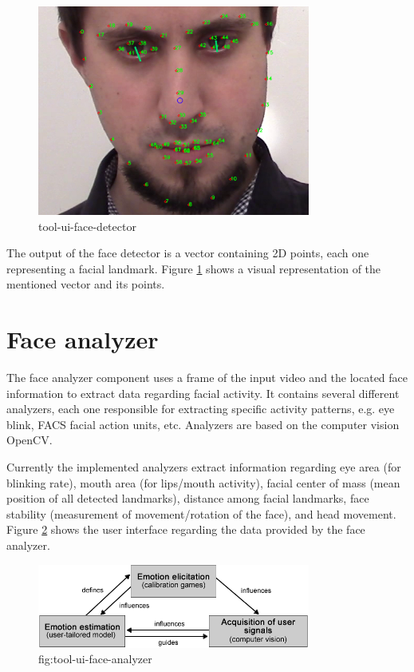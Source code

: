 \begin{figure}[h]
    \centering
    \includegraphics[width=0.8\textwidth]{figures/tool-ui-face-detector.png}
    \caption{tool-ui-face-detector}
    \label{fig:tool-ui-face-detector}
\end{figure}

The output of the face detector is a vector containing 2D points, each one representing a facial landmark. Figure \ref{fig:tool-ui-face-detector} shows a visual representation of the mentioned vector and its points.

\section{Face analyzer}

The face analyzer component uses a frame of the input video and the located face information to extract data regarding facial activity. It contains several different analyzers, each one responsible for extracting specific activity patterns, e.g. eye blink, FACS facial action units, etc. Analyzers are based on the computer vision OpenCV.

Currently the implemented analyzers extract information regarding eye area (for blinking rate), mouth area (for lips/mouth activity), facial center of mass (mean position of all detected landmarks), distance among facial landmarks, face stability (measurement of movement/rotation of the face), and head movement. Figure \ref{fig:tool-ui-face-analyzer} shows the user interface regarding the data provided by the face analyzer.

\begin{figure}[h]
    \centering
    \includegraphics[width=0.8\textwidth]{figures/method-components-dependency.png}
    \caption{fig:tool-ui-face-analyzer}
    \label{fig:tool-ui-face-analyzer}
\end{figure}

